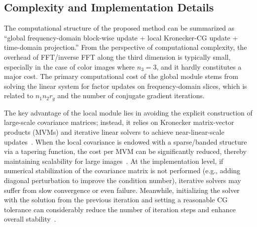 \documentclass[a4paper,12pt]{article}
\numberwithin{equation}{section}
\numberwithin{algorithm}{section}
\theoremstyle{remark}
\theoremstyle{definition}
\begin{document}
\subsection{Complexity and Implementation Details}  
The computational structure of the proposed method can be summarized as “global frequency-domain block-wise update + local Kronecker-CG update + time-domain projection.” From the perspective of computational complexity, the overhead of FFT/inverse FFT along the third dimension is typically small, especially in the case of color images where $n_3 = 3$, and it hardly constitutes a major cost. The primary computational cost of the global module stems from solving the linear system for factor updates on frequency-domain slices, which is related to $n_1 n_2 r_g$ and the number of conjugate gradient iterations.


The key advantage of the local module lies in avoiding the explicit construction of large-scale covariance matrices; instead, it relies on Kronecker matrix-vector products (MVMs) and iterative linear solvers to achieve near-linear-scale updates~\cite{lei2024glskf}. When the local covariance is endowed with a sparse/banded structure via a tapering function, the cost per MVM can be significantly reduced, thereby maintaining scalability for large images~\cite{furrer2006tapering}. At the implementation level, if numerical stabilization of the covariance matrix is not performed (e.g., adding diagonal perturbation to improve the condition number), iterative solvers may suffer from slow convergence or even failure. Meanwhile, initializing the solver with the solution from the previous iteration and setting a reasonable CG tolerance can considerably reduce the number of iteration steps and enhance overall stability~\cite{hestenes1952cg}.
\end{document}
